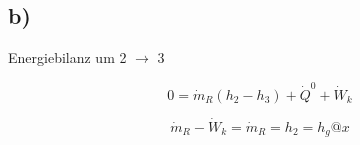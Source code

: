 

\subsection*{b)}
Energiebilanz um 2 $\rightarrow$ 3

\[
0 = \dot{m}_R (h_2 - h_3) + \dot{Q}^0 + \dot{W}_k
\]

\[
\dot{m}_R - \dot{W}_k = \dot{m}_R = h_2 = h_g @ x
\]